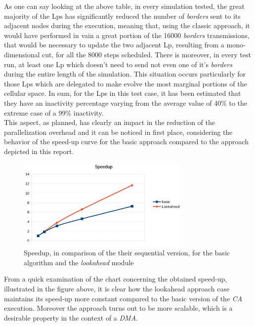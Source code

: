 \documentclass[12pt,a4paper,fleqn]{report}
\begin{document}
As one can say looking at the above table, in every simulation tested, the great majority of the Lps has significantly reduced the number of \textit{borders} sent to its adjacent nodes during the execution, meaning that, using the classic approach, it would have performed in vain a great portion of the 16000 \textit{borders} transmissions, that would be necessary to update the two adjacent Lp, resulting from a mono-dimensional cut, for all the 8000 steps scheduled. There is moreover, in every test run, at least one Lp which doesn't need to send not even one of it's \textit{borders} during the entire length of the simulation. This situation occurs particularly for those Lps which are delegated to make evolve the most marginal portions of the cellular space. In sum, for the Lps in this test case, it has been estimated that they have an inactivity percentage varying from the average value of 40\% to the extreme case of a 99\% inactivity.\\
This aspect, as planned, has clearly an impact in the reduction of the parallelization overhead and it can be noticed in first place, 
considering the behavior of the speed-up curve for the basic approach compared to the approach depicted in this report.\\

 \begin{figure}[ht!]
\label{chart2}
\centering
	\vspace{13pt}
    \includegraphics[trim=0mm 10mm 0mm 10mm, width=0.75\textwidth]{speedup_one}
    \caption{Speedup, in comparison of the their sequential version, for the basic algorithm and the \textit{lookahead} module}
\end{figure}

From a quick examination of the chart concerning the obtained speed-up, 
illustrated in the figure above, it is clear how 
the lookahead approach case maintains its speed-up more constant compared to the basic 
version of the \textit{CA} execution. Moreover the approach turns out to be more scalable, 
which is a desirable property in the context of a \textit{DMA}. \\
\end{document}
